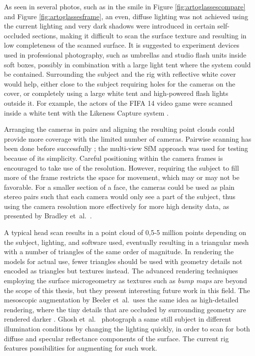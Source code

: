 As seen in several photos, such as in the smile in Figure \ref{fig:artoglassescompare} and Figure \ref{fig:artoglassesframe}, an even, diffuse lighting was not achieved using the current lighting and very dark shadows were introduced in certain self-occluded sections, making it difficult to scan the surface texture and resulting in low completeness of the scanned surface.
It is suggested to experiment devices used in professional photography, such as umbrellas and studio flash units inside soft boxes, possibly in combination with a large light tent where the system could be contained.
Surrounding the subject and the rig with reflective white cover would help, either close to the subject requiring holes for the cameras on the cover, or completely using a large white tent and high-powered flash lights outside it.
For example, the actors of the FIFA 14 video game were scanned inside a white tent with the Likeness Capture system \cite{eafifa14,capturelab}.

Arranging the cameras in pairs and aligning the resulting point clouds could provide more coverage with the limited number of cameras.
Pairwise scanning has been done before successfully \cite{eafifa14,beeler2010high,bradley2010high};
the multi-view SfM approach was used for testing because of its simplicity.
Careful positioning within the camera frames is encouraged to take use of the resolution.
However, requiring the subject to fill more of the frame restricts the space for movement, which may or may not be favorable.
For a smaller section of a face, the cameras could be used as plain stereo pairs such that each camera would only see a part of the subject, thus using the camera resolution more effectively for more high density data, as presented by Bradley et~al.\ \cite{bradley2010high}.


A typical head scan results in a point cloud of 0,5-5 million points depending on the subject, lighting, and software used, eventually resulting in a triangular mesh with a number of triangles of the same order of magnitude.
In rendering the models for actual use, fewer triangles should be used with geometry details not encoded as triangles but textures instead.
The advanced rendering techniques employing the surface microgeometry as textures such as \emph{bump maps} are beyond the scope of this thesis, but they present interesting future work in this field.
The mesoscopic augmentation by Beeler et~al.\ uses the same idea as high-detailed rendering, where the tiny details that are occluded by surrounding geometry are rendered darker \cite{beeler2010high}.
Ghosh et~al.\ \cite{ghosh2011multiview} photograph a same still subject in different illumination conditions by changing the lighting quickly, in order to scan for both diffuse and specular reflectance components of the surface.
The current rig features possibilities for augmenting for such work.

